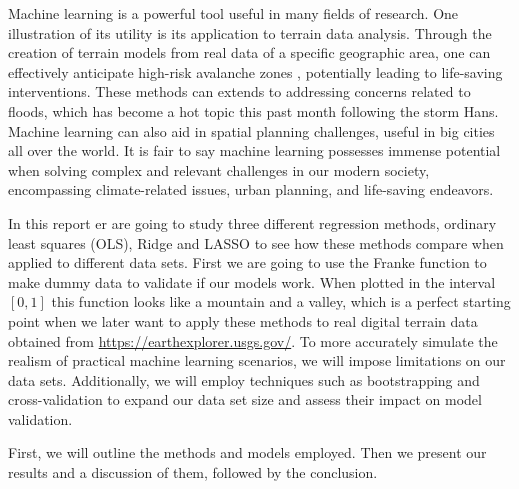\noindent Machine learning is a powerful tool useful in many fields of research. 
One illustration of its utility is its application to terrain data analysis.
Through the creation of terrain models from real data of a specific geographic area, 
one can effectively anticipate high-risk avalanche zones \cite{WEN2022103535}, 
potentially leading to life-saving interventions. 
These methods can extends to addressing concerns related to floods, which has become 
a hot topic this past month following the storm Hans. Machine learning can also aid in spatial planning challenges, useful in big cities all over the world. It is fair to say machine learning possesses immense potential when solving complex and relevant challenges in our modern society, encompassing climate-related issues, urban planning, and life-saving endeavors.

\noindent In this report er are going to study three different regression methods, ordinary least squares (OLS), Ridge and LASSO to see how these methods compare when applied to different data sets. First we are going to use the Franke function to make dummy data to validate if our models work. When plotted in the interval $[0,1]$ this function looks like a mountain and a valley, which is a perfect starting point when we later want to apply these methods to real digital terrain data obtained from \url{https://earthexplorer.usgs.gov/}. To more accurately simulate the realism of practical machine learning scenarios, we will impose limitations on our data sets. Additionally, we will employ
techniques such as bootstrapping and cross-validation to expand our data set size and assess their impact on model validation.

\noindent First, we will outline the methods and models employed. Then we present our results and a discussion of them, followed by the conclusion.

